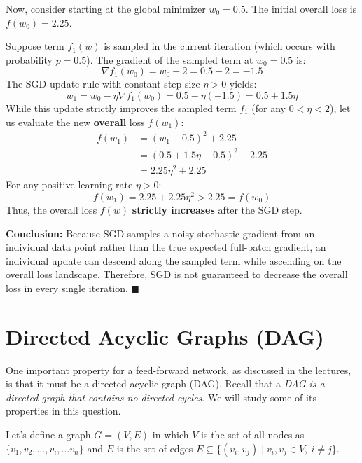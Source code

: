 \documentclass[11pt,english]{article}
\begin{document}
\begin{enumerate}[resume]
Now, consider starting at the global minimizer $w_0 = 0.5$. The initial overall loss is $f(w_0) = 2.25$.

Suppose term $f_1(w)$ is sampled in the current iteration (which occurs with probability $p = 0.5$).
The gradient of the sampled term at $w_0 = 0.5$ is:
\begin{equation}
    \nabla f_1(w_0) = w_0 - 2 = 0.5 - 2 = -1.5
\end{equation}
The SGD update rule with constant step size $\eta > 0$ yields:
\begin{equation}
    w_1 = w_0 - \eta \nabla f_1(w_0) = 0.5 - \eta(-1.5) = 0.5 + 1.5\eta
\end{equation}
While this update strictly improves the sampled term $f_1$ (for any $0 < \eta < 2$), let us evaluate the new \textbf{overall} loss $f(w_1)$:
\begin{align}
    f(w_1) &= \left(w_1 - 0.5\right)^2 + 2.25 \\
    &= \left(0.5 + 1.5\eta - 0.5\right)^2 + 2.25 \\
    &= 2.25\eta^2 + 2.25
\end{align}
For any positive learning rate $\eta > 0$:
\begin{equation}
    f(w_1) = 2.25 + 2.25\eta^2 > 2.25 = f(w_0)
\end{equation}
Thus, the overall loss $f(w)$ \textbf{strictly increases} after the SGD step.

\textbf{Conclusion:} Because SGD samples a noisy stochastic gradient from an individual data point rather than the true expected full-batch gradient, an individual update can descend along the sampled term while ascending on the overall loss landscape. Therefore, SGD is not guaranteed to decrease the overall loss in every single iteration. $\blacksquare$

\end{enumerate}

\newpage

\section{Directed Acyclic Graphs (DAG)}

One important property for a feed-forward network, as discussed in the lectures, is that it must be a directed acyclic graph (DAG). Recall that a \emph{DAG is a directed graph that contains no directed cycles}. We will study some of its properties in this question.

Let's define a graph $G=(V, E)$ in which $V$ is the set of all nodes as $\{v_1, v_2, ..., v_i, ... v_n\}$ and $E$ is the set of 
edges $E \subseteq \{(v_i, v_j) \mid v_i, v_j \in V, \ i \neq j\}$.
\end{document}
